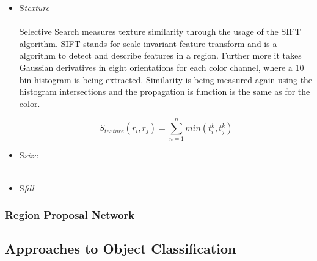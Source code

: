 \begin{itemize}
\begin{itemize}
            \item \large{S}\emph{texture} \\ \\
                Selective Search measures texture similarity through the usage of the SIFT algorithm. SIFT stands for scale invariant
                feature transform and is a algorithm to detect and describe features in a region. Further more it takes Gaussian derivatives
                in eight orientations for each color channel, where a 10 bin histogram is being extracted. Similarity is being measured
                again using the histogram intersections and the propagation is function is the same as for the color. \cite{selectivesearch}
                \begin{center}
                    \begin{equation*}
                        S_{texture}(r_i,r_j) = \sum_{n=1}^{n} min(t_i^{k},t_j^{k})
                    \end{equation*}\cite{selectivesearch}
                \end{center}

            \item \large{S}\emph{size} \\ \\

            \item \large{S}\emph{fill}
        \end{itemize}
\end{itemize}

\subsubsection{Region Proposal Network}

\subsection{Approaches to Object Classification}

     
